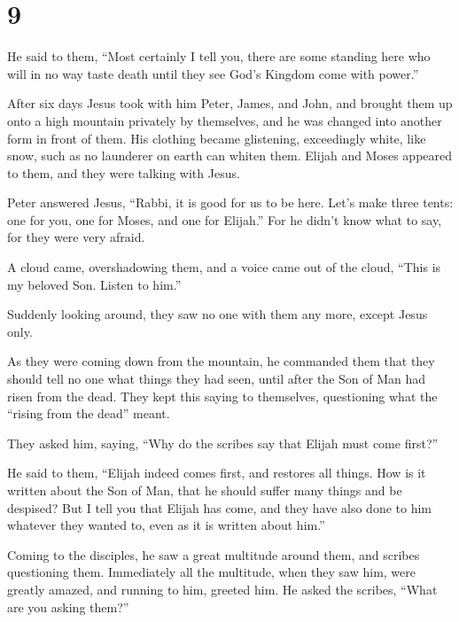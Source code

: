 \hypertarget{section-8}{%
\section{9}\label{section-8}}

 He said to them, ``Most certainly I tell you, there are
some standing here who will in no way taste death until they see God's
Kingdom come with power.''

 After six days Jesus took with him Peter, James, and John,
and brought them up onto a high mountain privately by themselves, and he
was changed into another form in front of them.  His
clothing became glistening, exceedingly white, like snow, such as no
launderer on earth can whiten them.  Elijah and Moses
appeared to them, and they were talking with Jesus.

 Peter answered Jesus, ``Rabbi, it is good for us to be
here. Let's make three tents: one for you, one for Moses, and one for
Elijah.''  For he didn't know what to say, for they were
very afraid.

 A cloud came, overshadowing them, and a voice came out of
the cloud, ``This is my beloved Son. Listen to him.''

 Suddenly looking around, they saw no one with them any
more, except Jesus only.

 As they were coming down from the mountain, he commanded
them that they should tell no one what things they had seen, until after
the Son of Man had risen from the dead.  They kept this
saying to themselves, questioning what the ``rising from the dead''
meant.

 They asked him, saying, ``Why do the scribes say that
Elijah must come first?''

 He said to them, ``Elijah indeed comes first, and restores
all things. How is it written about the Son of Man, that he should
suffer many things and be despised?  But I tell you that
Elijah has come, and they have also done to him whatever they wanted to,
even as it is written about him.''

 Coming to the disciples, he saw a great multitude around
them, and scribes questioning them.  Immediately all the
multitude, when they saw him, were greatly amazed, and running to him,
greeted him.  He asked the scribes, ``What are you asking
them?''

